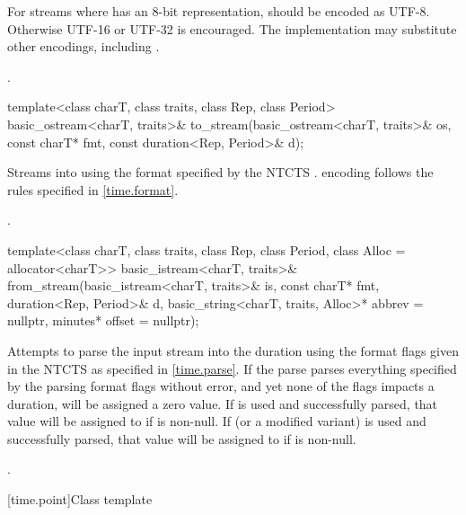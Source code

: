 \begin{itemdescr}
\pnum
For streams where  has an 8-bit representation,
 should be encoded as UTF-8. Otherwise UTF-16 or UTF-32 is encouraged.
The implementation may substitute other encodings, including .

\pnum
\returns {}.
\end{itemdescr}

%
\begin{itemdecl}
template<class charT, class traits, class Rep, class Period>
  basic_ostream<charT, traits>&
    to_stream(basic_ostream<charT, traits>& os, const charT* fmt,
              const duration<Rep, Period>& d);
\end{itemdecl}

\begin{itemdescr}
\pnum
\effects
Streams  into  using
the format specified by the NTCTS .
 encoding follows the rules specified in \ref{time.format}.

\pnum
\returns {}.
\end{itemdescr}

%
\begin{itemdecl}
template<class charT, class traits, class Rep, class Period, class Alloc = allocator<charT>>
  basic_istream<charT, traits>&
    from_stream(basic_istream<charT, traits>& is, const charT* fmt,
                duration<Rep, Period>& d,
                basic_string<charT, traits, Alloc>* abbrev = nullptr,
                minutes* offset = nullptr);
\end{itemdecl}

\begin{itemdescr}
\pnum
\effects
Attempts to parse the input stream 
into the duration 
using the format flags given in the NTCTS 
as specified in \ref{time.parse}.
If the parse parses everything specified by the parsing format flags without error,
and yet none of the flags impacts a duration,
 will be assigned a zero value.
If  is used and successfully parsed,
that value will be assigned to  if  is non-null.
If  (or a modified variant) is used and successfully parsed,
that value will be assigned to  if  is non-null.

\pnum
\returns {}.
\end{itemdescr}

[time.point]{Class template }

